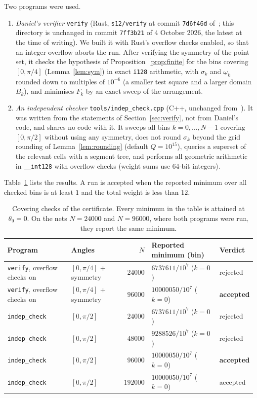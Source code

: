 \documentclass[11pt]{amsart}
\theoremstyle{definition}
\theoremstyle{remark}
\newcommand{\om}{\underline{\omega}}
\newcommand{\minw}{10000050}             %
\begin{document}
Two programs were used.
\begin{enumerate}
\item \emph{Daniel's verifier} \texttt{verify} (Rust, \texttt{s12/verify} at commit \texttt{7d6f46d} of~\cite{Dan26}; this directory is unchanged in commit \texttt{7ff3b21} of 4 October 2026, the latest at the time of writing). We built it with Rust's overflow checks enabled, so that an integer overflow aborts the run. After verifying the symmetry of the point set, it checks the hypothesis of Proposition~\ref{prop:finite} for the bins covering $[0,\pi/4]$ (Lemma~\ref{lem:sym}) in exact \texttt{i128} arithmetic, with $\sigma_k$ and $\om_k$ rounded down to multiples of $10^{-6}$ (a smaller test square and a larger domain $B_k$), and minimises $F_k$ by an exact sweep of the arrangement.
\item \emph{An independent checker} \texttt{tools/indep\_check.cpp} (C++, unchanged from~\cite{Ryu26}). It was written from the statements of Section~\ref{sec:verify}, not from Daniel's code, and shares no code with it. It sweeps all bins $k=0,\dots,N-1$ covering $[0,\pi/2]$ without using any symmetry, does not round $\sigma_k$ beyond the grid rounding of Lemma~\ref{lem:rounding} (default $Q=10^{15}$), queries a superset of the relevant cells with a segment tree, and performs all geometric arithmetic in \texttt{\_\_int128} with overflow checks (weight sums use 64-bit integers).
\end{enumerate}

Table~\ref{tab:runs} lists the results. A run is accepted when the reported minimum over all checked bins is at least $1$ and the total weight is less than $12$.

\begin{table}[ht]
\centering
\small
\begin{tabular}{@{}llrll@{}}
\toprule
Program & Angles & $N$ & Reported minimum (bin) & Verdict\\
\midrule
\texttt{verify}, overflow checks on & $[0,\pi/4]$ + symmetry & $24000$ & $6737611/10^7$ ($k=0$) & rejected\\
\texttt{verify}, overflow checks on & $[0,\pi/4]$ + symmetry & $96000$ & $\minw/10^7$ ($k=0$) & \textbf{accepted}\\
\texttt{indep\_check} & $[0,\pi/2]$ & $24000$ & $6737611/10^7$ ($k=0$) & rejected\\
\texttt{indep\_check} & $[0,\pi/2]$ & $48000$ & $9288526/10^7$ ($k=0$) & rejected\\
\texttt{indep\_check} & $[0,\pi/2]$ & $96000$ & $\minw/10^7$ ($k=0$) & \textbf{accepted}\\
\texttt{indep\_check} & $[0,\pi/2]$ & $192000$ & $\minw/10^7$ ($k=0$) & accepted\\
\bottomrule
\end{tabular}
\caption{Covering checks of the certificate. Every minimum in the table is attained at $\theta_0=0$. On the nets $N=24000$ and $N=96000$, where both programs were run, they report the same minimum.}\label{tab:runs}
\end{table}
\end{document}
